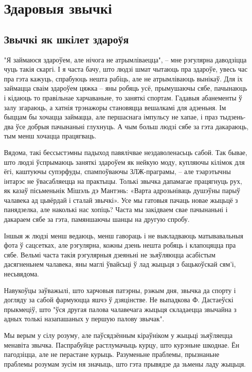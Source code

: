 \chapter{Здаровыя звычкі}

\section{Звычкі як шкілет здароўя}

"Я займаюся здароўем, але нічога не атрымліваецца", – мне рэгулярна даводзіцца чуць такія скаргі. І я часта бачу, што людзі шмат чытаюць пра здароўе, увесь час пра гэта кажуць, спрабуюць нешта рабіць, але не атрымліваюць вынікаў. Для іх займацца сваім здароўем цяжка – яны робяць усё, прымушаючы сябе, пачынаюць і кідаюць то правільнае харчаваньне, то заняткі спортам. Гадавыя абанементы ў залу згараюць, а хатнія трэнажоры становяцца вешалкамі для адзеньня. Ім быццам бы хочацца займацца, але першаснага імпульсу не хапае, і праз тыдзень-два ўсе добрыя пачынаньні глухнуць. А чым больш людзі сябе за гэта дакараюць, тым менш хочацца працягваць.

Вядома, такі бессыстэмны падыход павялічвае нездаволенасьць сабой. Так бывае, што людзі ўспрымаюць заняткі здароўем як нейкую моду, купляючы кілімок для ёгі, каштуючы супэрфуды, спампоўваючы ЗЛЖ-праграмы, – але тэарэтычны інтарэс не ўвасабляецца на практыцы. Толькі звычка дапамагае працягнуць рух, як казаў пісьменьнік Мішэль дэ Мантэнь: «Варта адрозьніваць душэўны парыў чалавека ад цьвёрдай і сталай звычкі». Усе мы гатовыя пачаць новае жыцьцё з панядзелка, але наколькі нас хопіць? Часта мы закідваем свае пачынаньні і дакараем сябе за гэта, памяншаючы шанцы на другую спробу.

Іншыя ж людзі менш ведаюць, менш гавораць і не выкладваюць матывавальныя фота ў сацсетках, але рэгулярна, кожны дзень нешта робяць і клапоцяцца пра сябе. Вельмі часта такія рэгулярныя дзеяньні не зьяўляюцца асабістым дасягненьнем чалавека, яны маглі ўвайсьці ў лад жыцьця з бацькоўскай сям'і, несьвядома.

Навукоўцы заўважылі, што харчовыя патэрны, рэжым дня, звычка да спорту і догляду за сабой фармуюцца яшчэ ў дзяцінстве. Не выпадкова Ф. Дастаеўскі прыкмеціў, што "ўся другая палова чалавечага жыцьця складаецца звычайна з адных толькі назапашаных у першую палову звычак".

Мы верым у сілу розуму, але паўсядзённым кіраўніком у жыцьці зьяўляецца менавіта звычка. Паспрабуйце растлумачыць курцу, што курэньне шкоднае. Ён пагодзіцца, але не перастане курыць. Разуменьне праблемы, прызнаньне праблемы розумам зусім ня значыць, што гэта прывядзе да зьмены ладу жыцьця.

